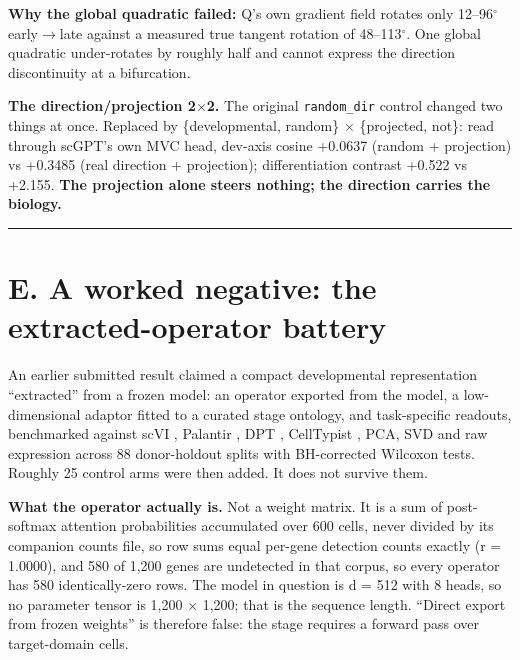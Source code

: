 \textbf{Why the global quadratic failed:} Q's own gradient field rotates only
12--96\(^{\circ}\) early\(\rightarrow\)late against a measured true tangent rotation of 48--113\(^{\circ}\). One global quadratic
under-rotates by roughly half and cannot express the direction discontinuity at a bifurcation.

\textbf{The direction/projection 2\(\times\)2.} The original \texttt{random\_dir} control changed two things at once.
Replaced by \{developmental, random\} \(\times\) \{projected, not\}: read through scGPT's own MVC head, dev-axis
cosine +0.0637 (random + projection) vs +0.3485 (real direction + projection); differentiation contrast
+0.522 vs +2.155. \textbf{The projection alone steers nothing; the direction carries the biology.}

\begin{center}\rule{0.5\linewidth}{0.5pt}\end{center}

\hypertarget{e.-a-worked-negative-the-extracted-operator-battery}{%
\section{E. A worked negative: the extracted-operator battery}\label{e.-a-worked-negative-the-extracted-operator-battery}}

An earlier submitted result claimed a compact developmental representation ``extracted'' from a frozen
model: an operator exported from the model, a low-dimensional adaptor fitted to a curated stage
ontology, and task-specific readouts, benchmarked against scVI \citep{lopez2018scvi}, Palantir \citep{setty2019palantir}, DPT \citep{haghverdi2016dpt}, CellTypist \citep{dominguezconde2022celltypist}, PCA, SVD and raw expression across 88 donor-holdout splits with BH-corrected Wilcoxon tests. Roughly 25 control arms
were then added. It does not survive them.

\textbf{What the operator actually is.} Not a weight matrix. It is a sum of post-softmax attention
probabilities accumulated over 600 cells, never divided by its companion counts file, so row sums equal
per-gene detection counts exactly (r = 1.0000), and 580 of 1,200 genes are undetected in that corpus,
so every operator has 580 identically-zero rows. The model in question is d = 512 with 8 heads, so no
parameter tensor is 1,200 \(\times\) 1,200; that is the sequence length. ``Direct export from frozen weights'' is
therefore false: the stage requires a forward pass over target-domain cells.

